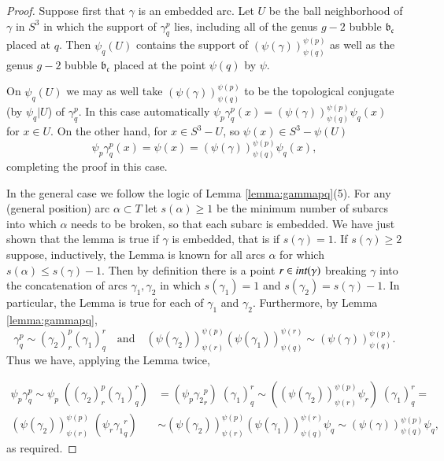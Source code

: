 \documentclass[12pt]{amsart}
\newcommand{\inter}{\mbox{${\rm int}$}}
\newcommand{\frb}{\mathfrak{b}}
\newcommand{\frc}{\mbox{$\mathfrak{c}$}}
\begin{document}
    \begin{proof}  %
    Suppose first that $\gamma$ is an embedded arc.  Let $U$ be the ball neighborhood of $\gamma$ in $S^3$ in which the support of $\gamma^p_q$ lies, including all of the genus $g-2$ bubble $\frb_{\frc}$ placed at $q$.  Then $\psi_q(U)$ contains the support of $(\psi(\gamma))^{\psi(p)}_{\psi(q)}$ as well as the genus $g-2$ bubble $\frb_{\frc}$ placed at  the point $\psi(q)$ by $\psi$.  
    
    On $\psi_q(U)$ we may as well take $(\psi(\gamma))^{\psi(p)}_{\psi(q)}$ to be the topological conjugate (by $\psi_q|U$) of $\gamma^p_q$. In this case automatically  $\psi_p \gamma^p_q (x) = (\psi(\gamma))^{\psi(p)}_{\psi(q)} \psi_q (x)$ for $x \in U$.   On the other hand, for $x \in S^3 - U$, so $\psi(x) \in S^3 - \psi(U)$ 
    \[ \psi_p \gamma^p_q (x) = \psi(x) = (\psi(\gamma))^{\psi(p)}_{\psi(q)} \psi_q (x),\]
    completing the proof in this case.  
    
    In the general case we follow the logic of Lemma \ref{lemma:gammapq}(5).  For any (general position) arc $\alpha \subset T$ let $s(\alpha) \geq 1$ be the minimum number of subarcs into which $\alpha$ needs to be broken, so that each subarc is embedded.  We have just shown that the lemma is true if $\gamma$ is embedded, that is if $s(\gamma) = 1$.  If $s(\gamma) \geq 2$ suppose, inductively, the Lemma is known for all arcs $\alpha$ for which $s(\alpha) \leq s(\gamma) - 1$.  Then by definition there is a point $r \in \inter(\gamma)$ breaking $\gamma$ into the concatenation of arcs $\gamma_1, \gamma_2$ in which $s(\gamma_1) = 1$ and $s(\gamma_2) = s(\gamma) - 1$.  In particular, the Lemma is true for each of $\gamma_1$ and $\gamma_2$.  
Furthermore, by Lemma \ref{lemma:gammapq}, 
\[\gamma^p_q \sim (\gamma_2)^p_r (\gamma_1)^r_q \quad \text{and} \quad (\psi(\gamma_2))^{\psi(p)}_{\psi(r)}(\psi(\gamma_1))^{\psi(r)}_{\psi(q)} \sim
  (\psi(\gamma))^{\psi(p)}_{\psi(q)}.\]  Thus we have, applying the Lemma twice, 

   \begin{align*}
 \psi_p \gamma^p_q \sim 
 \psi_p \;((\gamma_2)^p_r (\gamma_1)^r_q ) &= 
 (\psi_p {\gamma_2}^p_r )\;(\gamma_1)^r_q  \sim 
( (\psi(\gamma_2))^{\psi(p)}_{\psi(r)}\psi_r) \;(\gamma_1)^r_q  =\\
 (\psi(\gamma_2))^{\psi(p)}_{\psi(r)}\;(\psi_r {\gamma_1}^r_q)  &\sim
(\psi(\gamma_2))^{\psi(p)}_{\psi(r)}(\psi(\gamma_1))^{\psi(r)}_{\psi(q)}\psi_q \sim
  (\psi(\gamma))^{\psi(p)}_{\psi(q)} \psi_q,
\end{align*}
    as required.
 \end{proof}
 
\end{document}
